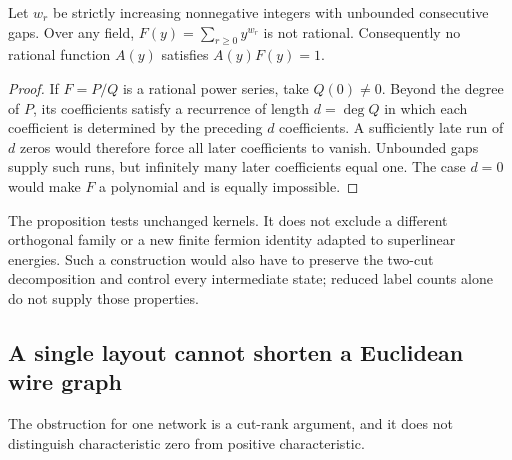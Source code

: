 \begin{lemma}\label{lem:lacunary-normalizer}
Let $w_r$ be strictly increasing nonnegative integers with unbounded consecutive gaps. Over any field, $F(y)=\sum_{r\geq0}y^{w_r}$ is not rational. Consequently no rational function $A(y)$ satisfies $A(y)F(y)=1$.
\end{lemma}
\begin{proof}
If $F=P/Q$ is a rational power series, take $Q(0)\ne0$. Beyond the degree of $P$, its coefficients satisfy a recurrence of length $d=\deg Q$ in which each coefficient is determined by the preceding $d$ coefficients. A sufficiently late run of $d$ zeros would therefore force all later coefficients to vanish. Unbounded gaps supply such runs, but infinitely many later coefficients equal one. The case $d=0$ would make $F$ a polynomial and is equally impossible.
\end{proof}

The proposition tests unchanged kernels. It does not exclude a different orthogonal family or a new finite fermion identity adapted to superlinear energies. Such a construction would also have to preserve the two-cut decomposition and control every intermediate state; reduced label counts alone do not supply those properties.

\subsection{A single layout cannot shorten a Euclidean wire graph}
The obstruction for one network is a cut-rank argument, and it does not distinguish characteristic zero from positive characteristic.


